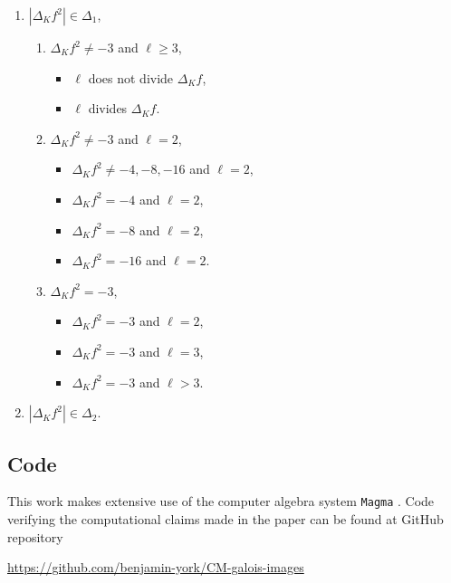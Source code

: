 \documentclass[11pt]{amsart}
\theoremstyle{definition}
\begin{document}
\begin{enumerate}
    \item[(\ref{sec-classnumber1})] $|\Delta_K f^2| \in \Delta_1$,
\begin{enumerate}
    \item[(\ref{sec-notminus3ellmorethan2})] $\Delta_K f^2 \neq -3$ and $\ell\geq 3$,
    \begin{itemize}
        \item[(\ref{sec-ellnotdividedisc})] $\ell$ does not divide $\Delta_K f$,
        \item[(\ref{sec-elldividesdisc})] $\ell$ divides $\Delta_K f$.
    \end{itemize}
    \item[(\ref{sec-notminus3ellequals2})] $\Delta_K f^2 \neq -3$ and $\ell=2$,
    \begin{itemize}
        \item[(\ref{sec-not34816ell2})] $\Delta_K f^2 \neq -4,-8,-16$ and $\ell =2$,
        \item[(\ref{sec-4ell2})] $\Delta_K f^2 = -4$ and $\ell=2$,
        \item[(\ref{sec-8ell2})] $\Delta_K f^2 = -8$ and $\ell=2$,
        \item[(\ref{sec-16ell2})] $\Delta_K f^2 = -16$ and $\ell=2$.
    \end{itemize}
    \item[(\ref{sec-delta3})] $\Delta_K f^2 = -3$,
    \begin{itemize}
        \item[(\ref{sec-delta3ell2})] $\Delta_K f^2 = -3$ and $\ell=2$,
        \item[(\ref{sec-delta3ell3})] $\Delta_K f^2 = -3$ and $\ell=3$,
        \item[(\ref{sec-delta3ellmorethan3})] $\Delta_K f^2 = -3$ and $\ell>3$.
    \end{itemize}
\end{enumerate}
 \item[(\ref{sec-classnumber2})] $|\Delta_K f^2| \in \Delta_2$.
\end{enumerate}

\subsection{Code}

This work makes extensive use of the computer algebra system \verb|Magma| \cite{magma}. Code verifying the computational claims made in the paper can be found at GitHub repository \cite{githubrepo}
\begin{center}
\url{https://github.com/benjamin-york/CM-galois-images}
\end{center}
\end{document}
